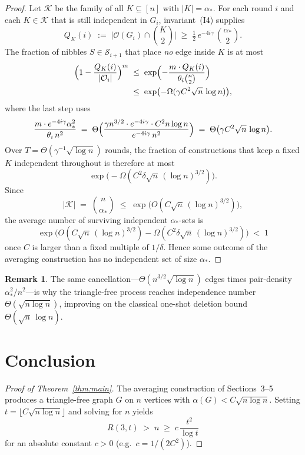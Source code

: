 \documentclass[11pt]{article}
\theoremstyle{definition}
\newtheorem{remark}[theorem]{Remark}
\newcommand{\cO}{\mathcal{O}}
\newcommand{\bin}[2]{\binom{#1}{#2}}
\begin{document}
\begin{proof}
Let $\mathcal{K}$ be the family of all $K\subseteq[n]$ with $|K|=\alpha_{*}$.
For each round $i$ and each $K\in\mathcal{K}$ that is still independent in $G_i$, invariant~(I4) supplies
\[
  Q_K(i)\;:=\;\bigl|\cO(G_i)\cap\bin{K}{2}\bigr|
  \;\ge\;
  \tfrac12\,e^{-4i\gamma}\,\bin{\alpha_{*}}{2}.
\]
The fraction of nibbles $S\in\mathcal{S}_{i+1}$ that place \emph{no} edge inside $K$ is at most
\begin{align*}
  \Bigl(1-\frac{Q_K(i)}{|\cO_i|}\Bigr)^{m}
  &\;\le\;
  \exp\Bigl(
    -\frac{m\cdot Q_K(i)}{\theta_i\bin{n}{2}}
  \Bigr)\\
  &\;\le\;
  \exp\bigl(-\Omega(\gamma C^{2}\sqrt{n}\,\log n)\bigr),
\end{align*}
where the last step uses
\[
  \frac{m\cdot e^{-4i\gamma}\alpha_{*}^{2}}{\theta_i\,n^{2}}
  \;=\;
  \Theta\Bigl(
    \frac{\gamma n^{3/2}\cdot e^{-4i\gamma}\cdot C^{2}n\log n}{e^{-4i\gamma}\,n^{2}}
  \Bigr)
  \;=\;
  \Theta\bigl(\gamma C^{2}\sqrt{n}\,\log n\bigr).
\]
Over $T=\Theta(\gamma^{-1}\sqrt{\log n})$ rounds, the fraction of constructions that keep a fixed $K$ independent throughout is therefore at most
\[
  \exp\bigl(-\Omega(C^{2}\delta\sqrt{n}\,(\log n)^{3/2})\bigr).
\]
Since
\[
  |\mathcal{K}|
  \;=\;
  \bin{n}{\alpha_{*}}
  \;\le\;
  \exp\bigl(O(C\sqrt{n}\,(\log n)^{3/2})\bigr),
\]
the average number of surviving independent $\alpha_{*}$-sets is
\[
  \exp\bigl(O(C\sqrt{n}\,(\log n)^{3/2})-\Omega(C^{2}\delta\sqrt{n}\,(\log n)^{3/2})\bigr)
  \;<\;1
\]
once $C$ is larger than a fixed multiple of $1/\delta$.
Hence some outcome of the averaging construction has no independent set of size $\alpha_{*}$.
\end{proof}

\begin{remark}
The same cancellation---$\Theta(n^{3/2}\sqrt{\log n})$ edges times pair-density $\alpha_{*}^{2}/n^{2}$---is why the triangle-free process reaches independence number $\Theta(\sqrt{n\log n})$, improving on the classical one-shot deletion bound $\Theta(\sqrt{n}\,\log n)$.
\end{remark}

\section{Conclusion}

\begin{proof}[Proof of Theorem~\ref{thm:main}]
The averaging construction of Sections~3--5 produces a triangle-free graph $G$ on $n$ vertices with $\alpha(G)<C\sqrt{n\log n}$.
Setting $t=\lfloor C\sqrt{n\log n}\rfloor$ and solving for $n$ yields
\[
  R(3,t)\;>\;n\;\ge\; c\,\frac{t^{2}}{\log t}
\]
for an absolute constant $c>0$ (e.g.\ $c=1/(2C^{2})$).
\end{proof}
\end{document}
